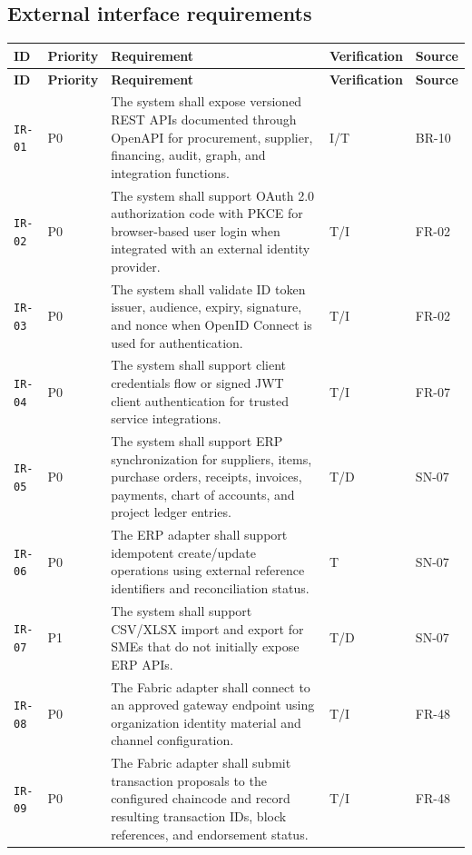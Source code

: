 \documentclass[11pt,a4paper]{article}
\begin{document}
\subsection{External interface requirements}\label{sec:interfaces}
\begin{footnotesize}
\begin{longtable}{@{}p{}p{}p{}p{}p{}@{}}
\rowcolor{gray!18}\textbf{ID} & \textbf{Priority} & \textbf{Requirement} & \textbf{Verification} & \textbf{Source} \\ \hline
\endfirsthead
\rowcolor{gray!18}\textbf{ID} & \textbf{Priority} & \textbf{Requirement} & \textbf{Verification} & \textbf{Source} \\ \hline
\endhead
\texttt{IR-01} & P0 & The system shall expose versioned REST APIs documented through OpenAPI for procurement, supplier, financing, audit, graph, and integration functions. & I/T & BR-10 \\ \hline
\texttt{IR-02} & P0 & The system shall support OAuth 2.0 authorization code with PKCE for browser-based user login when integrated with an external identity provider. & T/I & FR-02 \\ \hline
\texttt{IR-03} & P0 & The system shall validate ID token issuer, audience, expiry, signature, and nonce when OpenID Connect is used for authentication. & T/I & FR-02 \\ \hline
\texttt{IR-04} & P0 & The system shall support client credentials flow or signed JWT client authentication for trusted service integrations. & T/I & FR-07 \\ \hline
\texttt{IR-05} & P0 & The system shall support ERP synchronization for suppliers, items, purchase orders, receipts, invoices, payments, chart of accounts, and project ledger entries. & T/D & SN-07 \\ \hline
\texttt{IR-06} & P0 & The ERP adapter shall support idempotent create/update operations using external reference identifiers and reconciliation status. & T & SN-07 \\ \hline
\texttt{IR-07} & P1 & The system shall support CSV/XLSX import and export for SMEs that do not initially expose ERP APIs. & T/D & SN-07 \\ \hline
\texttt{IR-08} & P0 & The Fabric adapter shall connect to an approved gateway endpoint using organization identity material and channel configuration. & T/I & FR-48 \\ \hline
\texttt{IR-09} & P0 & The Fabric adapter shall submit transaction proposals to the configured chaincode and record resulting transaction IDs, block references, and endorsement status. & T/I & FR-48 \\ \hline

\end{longtable}
\end{footnotesize}
\end{document}
